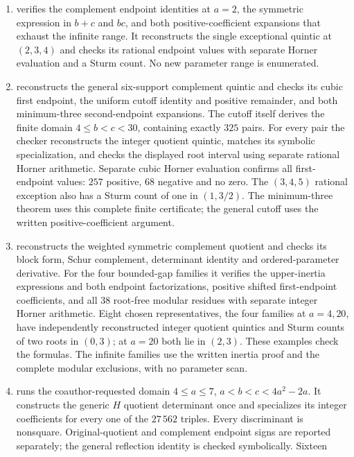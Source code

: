 \begin{enumerate}
\item {} verifies the complement
endpoint identities at $a=2$, the symmetric expression in $b+c$ and $bc$,
and both positive-coefficient expansions that exhaust the infinite range.
It reconstructs the single exceptional quintic at $(2,3,4)$ and checks
its rational endpoint values with separate Horner evaluation and a Sturm
count. No new parameter range is enumerated.
\item {} reconstructs the general
six-support complement quintic and checks its cubic first endpoint,
the uniform cutoff identity and positive remainder, and both
minimum-three second-endpoint expansions. The cutoff itself derives
the finite domain $4\leq b<c<30$, containing exactly $325$ pairs.
For every pair the checker reconstructs the integer quotient quintic,
matches its symbolic specialization, and checks the displayed root
interval using separate rational Horner arithmetic. Separate cubic
Horner evaluation confirms all first-endpoint values: $257$ positive,
$68$ negative and no zero. The $(3,4,5)$ rational exception also has a
Sturm count of one in $(1,3/2)$. The minimum-three theorem uses this
complete finite certificate; the general cutoff uses the written
positive-coefficient argument.
\item {} reconstructs the weighted
symmetric complement quotient and checks its block form, Schur complement,
determinant identity and ordered-parameter derivative. For the four
bounded-gap families it verifies the upper-inertia expressions and both
endpoint factorizations, positive shifted first-endpoint coefficients,
and all $38$ root-free modular residues with separate integer Horner
arithmetic. Eight chosen representatives, the four families at $a=4,20$,
have independently reconstructed integer quotient quintics and Sturm
counts of two roots in $(0,3)$; at $a=20$ both lie in $(2,3)$.
These examples check the formulas. The infinite families use the written
inertia proof and the complete modular exclusions, with no parameter scan.
\item {} runs the coauthor-requested
domain $4\leq a\leq7$, $a<b<c<4a^2-2a$. It constructs the generic
$H$ quotient determinant once and specializes its integer coefficients
for every one of the $27\,562$ triples. Every discriminant is nonsquare.
Original-quotient and complement endpoint signs are reported separately;
the general reflection identity is checked symbolically. Sixteen

\end{enumerate}
